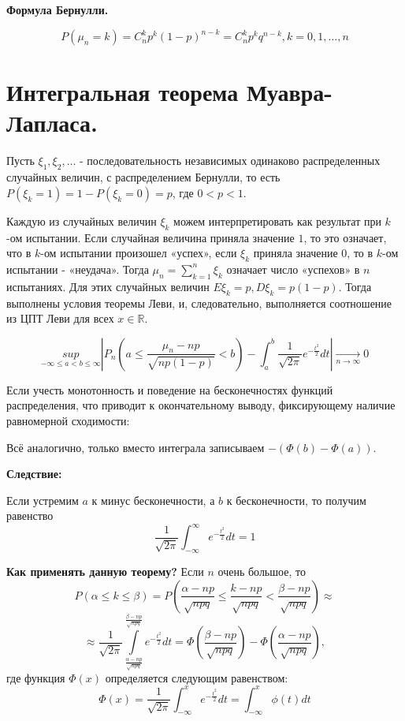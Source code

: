 \textbf{Формула Бернулли.}

\[ P(\mu_n = k) = C_n^kp^k(1-p)^{n-k} = C_n^k p^k q^{n-k}, k = 0,1, \dots, n \]

\section{Интегральная теорема Муавра-Лапласа.}

Пусть $\xi_1, \xi_2, \dots$ - последовательность независимых одинаково распределенных случайных величин, с распределением Бернулли, то есть $P(\xi_k = 1) = 1 - P(\xi_k = 0) = p$, где $0 < p < 1$.

Каждую из случайных величин $\xi_k$ можем интерпретировать как результат при $k$-ом испытании. Если случайная величина приняла значение $1$, то это означает, что в $k$-ом испытании произошел «успех», если $\xi_k$ приняла значение 0, то в $k$-ом испытании - «неудача». Тогда $\mu_n = \sum\limits_{k=1}^{n} \xi_k$ означает число «успехов» в $n$ испытаниях. Для этих случайных величин $E\xi_k = p, D\xi_k = p(1-p)$. Тогда выполнены условия теоремы Леви, и, следовательно, выполняется соотношение из ЦПТ Леви для всех $x \in \mathbb{R}$.

\[ \underset{-\infty \le a < b \le \infty}{sup} \left| P_n \left( a \le \dfrac{\mu_n - np}{\sqrt{np(1 - p)}} < b \right) - \int_{a}^{b} \dfrac{1}{\sqrt{2 \pi}} e^{-\frac{t^2}{2}}dt \right| \underset{n \to \infty}{\to} 0 \]

Если учесть монотонность и поведение на бесконечностях функций распределения, что приводит к окончательному выводу, фиксирующему наличие равномерной сходимости:

Всё аналогично, только вместо интеграла записываем $- (\Phi (b) - \Phi (a))$.

\noindent \textbf{Следствие:}

Если устремим $a$ к минус бесконечности, а $b$ к бесконечности, то получим равенство
\[ \frac{1}{\sqrt{2 \pi}} \int_{-\infty}^{\infty} e^{-\frac{t^2}{2}} dt = 1 \]

\noindent \textbf{Как применять данную теорему?} Если $n$ очень большое, то
\[ P(\alpha \le k \le \beta) = P \left( \frac{\alpha - np}{\sqrt{npq}} \le \frac{k - np}{\sqrt{npq}} < \frac{\beta - np}{\sqrt{npq}} \right) \approx \]
\[ \approx \frac{1}{\sqrt{2 \pi}} \int\limits_{\frac{\alpha - np}{\sqrt{npq}}}^{\frac{\beta - np}{\sqrt{npq}}} e^{-\frac{t^2}{2}} dt = \Phi \left( \frac{\beta - np}{\sqrt{npq}} \right) - \Phi \left( \frac{\alpha - np}{\sqrt{npq}} \right), \]
где функция $\Phi (x)$ определяется следующим равенством:
\[ \Phi (x) = \frac{1}{\sqrt{2 \pi}} \int_{-\infty}^{x} e^{-\frac{t^2}{2}} dt = \int_{-\infty}^{x} \phi (t) dt \]

